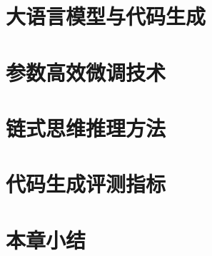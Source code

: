 
\section{大语言模型与代码生成}


\section{参数高效微调技术}


\section{链式思维推理方法}


\section{代码生成评测指标}


\section{本章小结}
